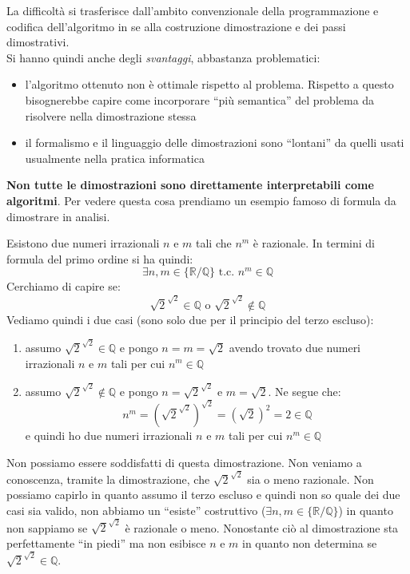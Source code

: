 \documentclass[a4paper,12pt, oneside]{book}
\begin{document}
La difficoltà si trasferisce dall'ambito convenzionale della programmazione e
codifica dell'algoritmo in se alla costruzione dimostrazione e dei passi
dimostrativi.\\
Si hanno quindi anche degli \textit{svantaggi}, abbastanza problematici:
\begin{itemize}
  \item l'algoritmo ottenuto non è ottimale rispetto al problema. Rispetto a
  questo bisognerebbe capire come incorporare ``più semantica'' del problema da
  risolvere nella dimostrazione stessa
  \item il formalismo e il linguaggio delle dimostrazioni sono ``lontani'' da
  quelli usati usualmente nella pratica informatica
\end{itemize}
\textbf{Non tutte le dimostrazioni sono direttamente interpretabili come
  algoritmi}. Per vedere questa cosa prendiamo un esempio famoso di formula da
dimostrare in analisi.
\begin{esempio}
  Esistono due numeri irrazionali $n$ e $m$ tali che $n^m$ è razionale. In
  termini di formula del primo ordine si ha quindi:
  \[\exists n,m\in\{\mathbb{R}/\mathbb{Q}\}\mbox{ t.c. }n^m\in\mathbb{Q}\]
  Cerchiamo di capire se:
  \[\sqrt{2}^{\sqrt{2}}\in \mathbb{Q}\mbox{ o }\sqrt{2}^{\sqrt{2}}\not\in
    \mathbb{Q}\]
  Vediamo quindi i due casi (sono solo due per il principio del terzo escluso):
  \begin{enumerate}
    \item assumo $\sqrt{2}^{\sqrt{2}}\in \mathbb{Q}$ e pongo $n=m=\sqrt{2}$
    avendo trovato due numeri irrazionali $n$ e $m$ tali per cui
    $n^m\in\mathbb{Q}$ 
    \item assumo $\sqrt{2}^{\sqrt{2}}\not\in \mathbb{Q}$ e pongo
    $n=\sqrt{2}^{\sqrt{2}}$ e $m=\sqrt{2}$. Ne segue che:
    \[n^m=\left(\sqrt{2}^{\sqrt{2}}\right)^{\sqrt{2}}=(\sqrt{2})^2=2\in\mathbb{Q}\] 
    e quindi ho due numeri irrazionali $n$ e $m$ tali per cui $n^m\in\mathbb{Q}$
  \end{enumerate}
  Non possiamo essere soddisfatti di questa dimostrazione. Non veniamo a
  conoscenza, tramite la dimostrazione, che $\sqrt{2}^{\sqrt{2}}$ sia o meno
  razionale. Non possiamo capirlo in quanto assumo il terzo escluso e quindi non
  so quale dei due casi sia valido, non abbiamo un ``esiste'' costruttivo
  ($\exists n,m\in \{\mathbb{R}/\mathbb{Q}\}$) in quanto non sappiamo se
  $\sqrt{2}^{\sqrt{2}}$ è razionale o meno. Nonostante ciò al dimostrazione sta
  perfettamente ``in piedi'' ma non esibisce $n$ e $m$ in quanto non determina
  se $\sqrt{2}^{\sqrt{2}}\in\mathbb{Q}$.
\end{esempio}
\end{document}

